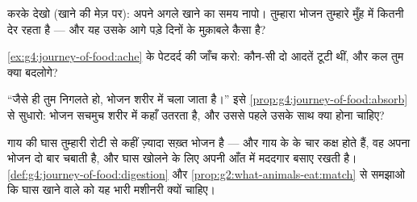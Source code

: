 \begin{exercise}[$\star$]\label{exo:g4:journey-of-food:8}
करके देखो (खाने की मेज़ पर): अपने अगले खाने का समय नापो। तुम्हारा भोजन
तुम्हारे मुँह में कितनी देर रहता है --- और यह उसके आगे पड़े दिनों के
मुक़ाबले कैसा है?
\end{exercise}

\begin{exercise}[$\star\star$]\label{exo:g4:journey-of-food:9}
\cref{ex:g4:journey-of-food:ache} के पेटदर्द की जाँच करो: कौन-सी दो
आदतें टूटी थीं, और कल तुम क्या बदलोगे?
\end{exercise}

\begin{exercise}[$\star\star$]\label{exo:g4:journey-of-food:10}
``जैसे ही तुम निगलते हो, भोजन शरीर में चला जाता है।'' इसे
\cref{prop:g4:journey-of-food:absorb} से सुधारो: भोजन सचमुच शरीर में
कहाँ उतरता है, और उससे पहले उसके साथ क्या होना चाहिए?
\end{exercise}

\begin{exercise}[$\star\star\star$]\label{exo:g4:journey-of-food:11}
गाय की घास तुम्हारी रोटी से कहीं ज़्यादा सख़्त भोजन है --- और गाय के
 के चार कक्ष होते हैं, वह अपना भोजन दो बार चबाती है, और घास खोलने
के लिए अपनी आँत में मददगार  बसाए रखती है।
\cref{def:g4:journey-of-food:digestion} और
\cref{prop:g2:what-animals-eat:match} से समझाओ कि घास खाने वाले को यह
भारी मशीनरी क्यों चाहिए।
\end{exercise}
